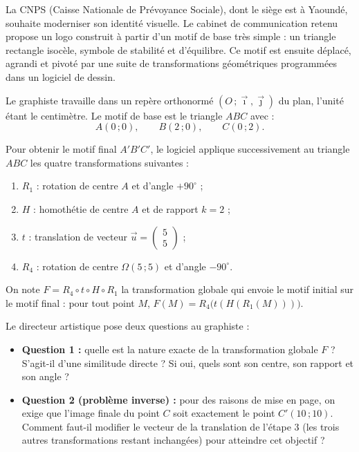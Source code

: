 \documentclass[11pt]{article}
\newcommand{\cle}[1]{{\popxbold\color{popdark}#1}}
\begin{document}
La \cle{CNPS} (Caisse Nationale de Prévoyance Sociale), dont le siège est à Yaoundé, souhaite moderniser son identité visuelle. Le cabinet de communication retenu propose un logo construit à partir d'un \cle{motif de base} très simple : un triangle rectangle isocèle, symbole de stabilité et d'équilibre. Ce motif est ensuite déplacé, agrandi et pivoté par une suite de transformations géométriques programmées dans un logiciel de dessin.

Le graphiste travaille dans un repère orthonormé $(O\,;\vec{\imath},\vec{\jmath})$ du plan, l'unité étant le centimètre. Le motif de base est le triangle $ABC$ avec :
\[ A(0\,;0), \qquad B(2\,;0), \qquad C(0\,;2). \]

Pour obtenir le motif final $A'B'C'$, le logiciel applique successivement au triangle $ABC$ les quatre transformations suivantes :

\begin{enumerate}
\item $R_1$ : rotation de centre $A$ et d'angle $+90^\circ$ ;
\item $H$ : homothétie de centre $A$ et de rapport $k = 2$ ;
\item $t$ : translation de vecteur $\vec{u} = \begin{pmatrix} 5 \\ 5 \end{pmatrix}$ ;
\item $R_4$ : rotation de centre $\Omega(5\,;5)$ et d'angle $-90^\circ$.
\end{enumerate}

On note $F = R_4 \circ t \circ H \circ R_1$ la transformation globale qui envoie le motif initial sur le motif final : pour tout point $M$, $F(M) = R_4\bigl(t(H(R_1(M)))\bigr)$.

Le directeur artistique pose deux questions au graphiste :
\begin{itemize}
\item \textbf{Question 1 :} quelle est la nature exacte de la transformation globale $F$ ? S'agit-il d'une similitude directe ? Si oui, quels sont son centre, son rapport et son angle ?
\item \textbf{Question 2 (problème inverse) :} pour des raisons de mise en page, on exige que l'image finale du point $C$ soit exactement le point $C'(10\,;10)$. Comment faut-il modifier le vecteur de la translation de l'étape 3 (les trois autres transformations restant inchangées) pour atteindre cet objectif ?
\end{itemize}
\end{document}
